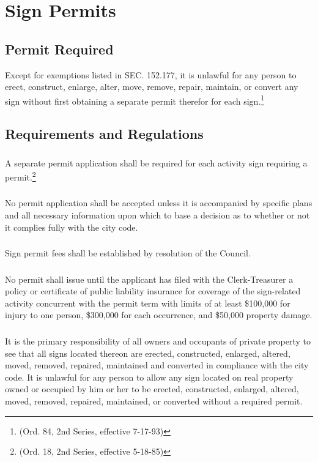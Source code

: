 \section{Sign Permits}
\subsection{Permit Required}
Except for exemptions listed in SEC. 152.177, it is unlawful for any person to erect, construct, enlarge, alter, move, remove, repair, maintain, or convert any sign without first obtaining a separate permit therefor for each sign.\footnote{(Ord. 84, 2nd Series, effective 7-17-93)}
\subsection{Requirements and Regulations}
\subsubsection{}
A separate permit application shall be required for each activity sign requiring a permit.\footnote{(Ord. 18, 2nd Series, effective 5-18-85)}
\subsubsection{}
No permit application shall be accepted unless it is accompanied by specific plans and all necessary information upon which to base a decision as to whether or not it complies fully with the city code.
\subsubsection{}
Sign permit fees shall be established by resolution of the Council.
\subsubsection{}
No permit shall issue until the applicant has filed with the Clerk-Treasurer a policy or certificate of public liability insurance for coverage of the sign-related activity concurrent with the permit term with limits of at least \$100,000 for injury to one person, \$300,000 for each occurrence, and \$50,000 property damage.
\subsubsection{}
It is the primary responsibility of all owners and occupants of private property to see that all signs located thereon are erected, constructed, enlarged, altered, moved, removed, repaired, maintained and converted in compliance with the city code.  It is unlawful for any person to allow any sign located on real property owned or occupied by him or her to be erected, constructed, enlarged, altered, moved, removed, repaired, maintained, or converted without a required permit.
